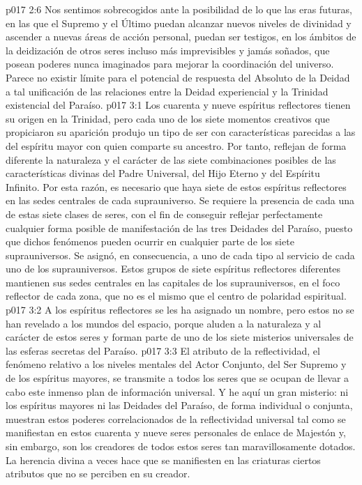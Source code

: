 \vs p017 2:6 Nos sentimos sobrecogidos ante la posibilidad de lo que las eras futuras, en las que el Supremo y el Último puedan alcanzar nuevos niveles de divinidad y ascender a nuevas áreas de acción personal, puedan ser testigos, en los ámbitos de la deidización de otros seres incluso más imprevisibles y jamás soñados, que posean poderes nunca imaginados para mejorar la coordinación del universo. Parece no existir límite para el potencial de respuesta del Absoluto de la Deidad a tal unificación de las relaciones entre la Deidad experiencial y la Trinidad existencial del Paraíso.
\vs p017 3:1 Los cuarenta y nueve espíritus reflectores tienen su origen en la Trinidad, pero cada uno de los siete momentos creativos que propiciaron su aparición produjo un tipo de ser con características parecidas a las del espíritu mayor con quien comparte su ancestro. Por tanto, reflejan de forma diferente la naturaleza y el carácter de las siete combinaciones posibles de las características divinas del Padre Universal, del Hijo Eterno y del Espíritu Infinito. Por esta razón, es necesario que haya siete de estos espíritus reflectores en las sedes centrales de cada suprauniverso. Se requiere la presencia de cada una de estas siete clases de seres, con el fin de conseguir reflejar perfectamente cualquier forma posible de manifestación de las tres Deidades del Paraíso, puesto que dichos fenómenos pueden ocurrir en cualquier parte de los siete suprauniversos. Se asignó, en consecuencia, a uno de cada tipo al servicio de cada uno de los suprauniversos. Estos grupos de siete espíritus reflectores diferentes mantienen sus sedes centrales en las capitales de los suprauniversos, en el foco reflector de cada zona, que no es el mismo que el centro de polaridad espiritual.
\vs p017 3:2 A los espíritus reflectores se les ha asignado un nombre, pero estos no se han revelado a los mundos del espacio, porque aluden a la naturaleza y al carácter de estos seres y forman parte de uno de los siete misterios universales de las esferas secretas del Paraíso.
\vs p017 3:3 El atributo de la reflectividad, el fenómeno relativo a los niveles mentales del Actor Conjunto, del Ser Supremo y de los espíritus mayores, se transmite a todos los seres que se ocupan de llevar a cabo este inmenso plan de información universal. Y he aquí un gran misterio: ni los espíritus mayores ni las Deidades del Paraíso, de forma individual o conjunta, muestran estos poderes correlacionados de la reflectividad universal tal como se manifiestan en estos cuarenta y nueve seres personales de enlace de Majestón y, sin embargo, son los creadores de todos estos seres tan maravillosamente dotados. La herencia divina a veces hace que se manifiesten en las criaturas ciertos atributos que no se perciben en su creador.
